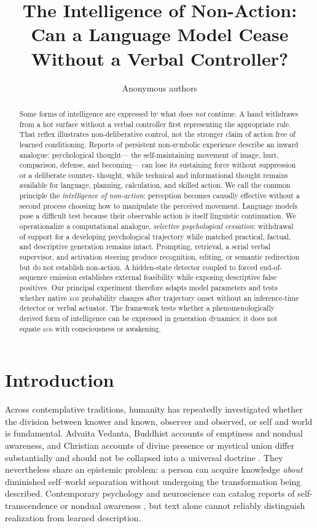 \documentclass[10pt,twocolumn]{article}
\title{The Intelligence of Non-Action:\\
Can a Language Model Cease Without a Verbal Controller?}
\author{Anonymous authors}
\date{}
\newcommand{\EOS}{\textsc{eos}}
\begin{document}
\maketitle

\begin{abstract}
Some forms of intelligence are expressed by what does \emph{not} continue. A
hand withdraws from a hot surface without a verbal controller first representing
the appropriate rule. That reflex illustrates non-deliberative control, not the
stronger claim of action free of learned conditioning. Reports of persistent
non-symbolic experience describe an inward analogue: psychological thought---
the self-maintaining movement of image, hurt, comparison, defense, and becoming---
can lose its sustaining force without suppression or a deliberate counter-
thought, while technical and informational thought remains available for language,
planning, calculation, and skilled action. We call the common
principle the \emph{intelligence of non-action}: perception becomes causally
effective without a second process choosing how to manipulate the perceived
movement. Language models pose a difficult test because their observable action
is itself linguistic continuation. We operationalize a computational analogue,
\emph{selective psychological cessation}: withdrawal of support for a developing
psychological trajectory while matched practical, factual, and descriptive
generation remains intact. Prompting, retrieval, a serial verbal supervisor, and
activation steering produce recognition, editing, or semantic redirection but
do not establish non-action. A hidden-state detector coupled to forced end-of-
sequence emission establishes external feasibility while exposing descriptive
false positives. Our principal experiment therefore adapts model parameters and
tests whether native \EOS{} probability changes after trajectory onset without
an inference-time detector or verbal actuator. The framework tests whether a
phenomenologically derived form of intelligence can be expressed in generation
dynamics; it does not equate \EOS{} with consciousness or awakening.
\end{abstract}

\section{Introduction}

Across contemplative traditions, humanity has repeatedly investigated whether
the division between knower and known, observer and observed, or self and world
is fundamental. Advaita Vedanta, Buddhist accounts of emptiness and nondual
awareness, and Christian accounts of divine presence or mystical union differ
substantially and should not be collapsed into a universal doctrine
\citep{loy1988nonduality,katz1978mysticism,mcginn1991foundations}. They
nevertheless share an epistemic problem: a person can acquire knowledge
\emph{about} diminished self--world separation without undergoing the
transformation being described. Contemporary psychology and neuroscience can
catalog reports of self-transcendence or nondual awareness
\citep{yaden2017selftranscendent,josipovic2014nondual}, but text alone cannot
reliably distinguish realization from learned description.
\end{document}
